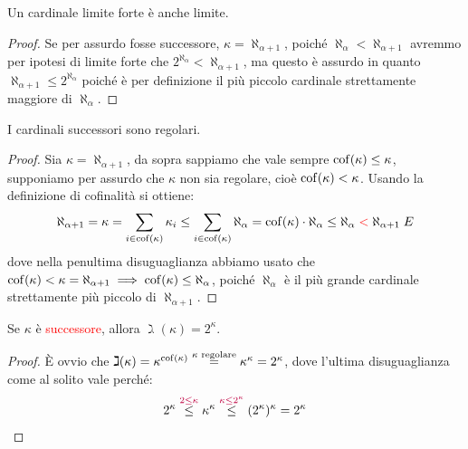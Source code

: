 \begin{proposition}
	Un cardinale limite forte \`e anche limite.
\end{proposition}

\begin{proof}
	Se per assurdo fosse successore, $\kappa = \aleph_{\alpha + 1}$, poich\'e $\aleph_\alpha < \aleph_{\alpha + 1}$ avremmo per ipotesi di limite forte che $2^{\aleph_\alpha} < \aleph_{\alpha + 1}$, ma questo \`e assurdo in quanto $\aleph_{\alpha + 1} \leq 2^{\aleph_\alpha}$ poich\'e \`e per definizione il pi\`u piccolo cardinale strettamente maggiore di $\aleph_{\alpha}$.
\end{proof}

\begin{proposition}
	I cardinali successori sono regolari.
\end{proposition}

\begin{proof}
	Sia $\kappa = \aleph_{\alpha + 1}$, da sopra sappiamo che vale sempre $\operatorname{cof}(\kappa) \leq \kappa$, supponiamo per assurdo che $\kappa$ non sia regolare, cio\`e $\operatorname{cof}(\kappa) < \kappa$. Usando la definizione di cofinalit\`a si ottiene:
	\[ \aleph_{\alpha + 1} = \kappa = \sum_{i \in \cof(\kappa)} \kappa_i \leq \sum_{i \in \cof(\kappa)} \aleph_\alpha = \cof(\kappa) \cdot \aleph_\alpha \leq \aleph_\alpha \;\textcolor{red}{<}\; \aleph_{\alpha + 1} \; \lightning
		\]
	dove nella penultima disuguaglianza abbiamo usato che $\operatorname{cof}(\kappa) < \kappa = \aleph_{\alpha + 1} \implies \operatorname{cof}(\kappa) \leq \aleph_\alpha$, poich\'e $\aleph_\alpha$ \`e il pi\`u grande cardinale strettamente pi\`u piccolo di $\aleph_{\alpha + 1}$.
\end{proof}

\begin{corollary}
	Se $\kappa$ \`e \textcolor{red}{successore}, allora $\gimel(\kappa) = 2^{\kappa}$.
\end{corollary}

\begin{proof}
	\`E ovvio che $\gimel(\kappa) = \kappa^{\operatorname{cof}(\kappa)} \overset{\text{$\kappa$ regolare}}{=} \kappa^\kappa = 2^{\kappa}$, dove l'ultima disuguaglianza come al solito vale perch\'e:
	\[ 2^{\kappa} \overset{\textcolor{purple}{2 \leq \kappa}}{\leq} \kappa^{\kappa} \overset{\textcolor{purple}{\kappa \leq 2^\kappa}}{\leq} (2^{\kappa})^{\kappa} = 2^{\kappa}
		\]
\end{proof}

